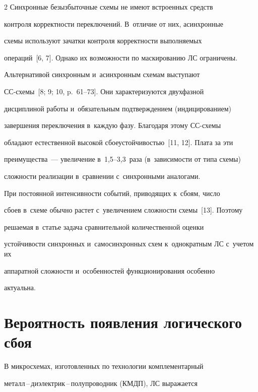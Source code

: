 \begin{multicols}{2}
  Синхронные безызбыточные схемы не имеют встроенных средств 

контроля корректности переключений. В~отличие от них, асинхронные 

схемы используют зачатки контроля корректности выполняемых 

операций~[6, 7]. Однако их возможности по маскированию ЛС ограничены.

  

  Альтернативой синхронным и~асинхронным схемам выступают 

СС-схе\-мы~[8; 9; 10, p.~61--73]. Они характеризуются двухфазной 

дисциплиной работы и~обязательным под\-тверж\-де\-ни\-ем (индицированием) 

завершения переключения в~каж\-дую фазу. Благодаря этому СС-схе\-мы 

обладают естественной высокой сбоеустойчивостью~[11, 12]. Плата за эти 

преимущества~--- увеличение в~1,5--3,3~раза (в~зависимости от типа схемы) 

сложности реализации в~сравнении с~синхронными аналогами.

  

  При постоянной интенсивности событий, приводящих к~сбоям, число 

сбоев в~схеме обычно рас\-тет с~увеличением сложности схемы~[13]. Поэтому 

решаемая в~статье задача сравнительной количественной оценки 

устойчивости синхронных и~самосинхронных схем к~однократным ЛС с~учетом их 

аппаратной сложности и~особенностей функционирования особенно 

актуальна.



\vspace*{-7pt}

  

\section{Вероятность появления логического сбоя}



\vspace*{-2pt}

  

  В микросхемах, изготовленных по технологии комплементарный  

ме\-талл\,--\,ди\-элект\-рик\,--\,по\-лу\-про\-вод\-ник (КМДП), ЛС выражается 


\end{multicols}
